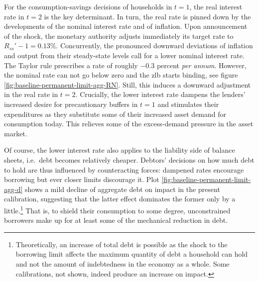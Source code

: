 \documentclass[12pt]{article} %
\numberwithin{equation}{section} %
\numberwithin{figure}{section}
\numberwithin{table}{section}
\begin{document}

For the consumption-savings decisions of households in $t=1$, the real interest rate in $t=2$ is the key determinant. In turn, the real rate is pinned down by the developments of the nominal interest rate and of inflation. Upon announcement of the shock, the monetary authority adjusts immediately its target rate to $R_{ss}' - 1 = 0.13\%$. Concurrently, the pronounced downward deviations of inflation and output from their steady-state levels call for a lower nominal interest rate. The Taylor rule prescribes a rate of roughly $-0.3$ percent \textit{per annum}. However, the nominal rate can not go below zero and the \Gls{zlb} starts binding, see figure \ref{fig:baseline-permanent-limit-agg-RN}. Still, this induces a downward adjustment in the real rate in $t=2$. Crucially, the lower interest rate dampens the lenders' increased desire for precautionary buffers in $t=1$ and stimulates their expenditures as they substitute some of their increased asset demand for consumption today. This relieves some of the excess-demand pressure in the asset market. 

Of course, the lower interest rate also applies to the liability side of balance sheets, i.e.~debt becomes relatively cheaper. Debtors' decisions on how much debt to hold are thus influenced by counteracting forces: dampened rates encourage borrowing but ever closer limits discourage it. Plot \ref{fig:baseline-permanent-limit-agg-d} shows a mild decline of aggregate debt on impact in the present calibration, suggesting that the latter effect dominates the former only by a little.\footnote{Theoretically, an increase of total debt is possible as the shock to the borrowing limit affects the maximum quantity of debt a household can hold and not the amount of indebtedness in the economy as a whole. Some calibrations, not shown, indeed produce an increase on impact.} That is, to shield their consumption to some degree, unconstrained borrowers make up for at least some of the mechanical reduction in debt. %
\end{document}
